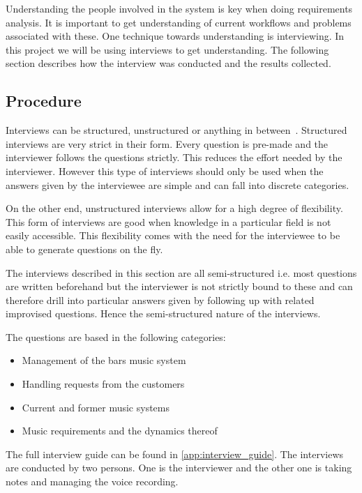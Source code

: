 \label{interviews}

Understanding the people involved in the system is key when doing requirements analysis. It is important to get understanding of current workflows and problems associated with these. One technique towards understanding is interviewing. In this project we will be using interviews to get understanding. The following section describes how the interview was conducted and the results collected.

\subsection{Procedure}
\label{sub:procedure}

Interviews can be structured, unstructured or anything in between~\cite{benyon2013designing}. Structured interviews are very strict in their form. Every question is pre-made and the interviewer follows the questions strictly. This reduces the effort needed by the interviewer. However this type of interviews should only be used when the answers given by the interviewee are simple and can fall into discrete categories.

On the other end, unstructured interviews allow for a high degree of flexibility. This form of interviews are good when knowledge in a particular field is not easily accessible. This flexibility comes with the need for the interviewee to be able to generate questions on the fly.

The interviews described in this section are all semi-structured i.e. most questions are written beforehand but the interviewer is not strictly bound to these and can therefore drill into particular answers given by following up with related improvised questions. Hence the semi-structured nature of the interviews.

The questions are based in the following categories:

\begin{itemize}
  \item Management of the bars music system
  \item Handling requests from the customers
  \item Current and former music systems
  \item Music requirements and the dynamics thereof
\end{itemize}

The full interview guide can be found in \cref{app:interview_guide}. The interviews are conducted by two persons. One is the interviewer and the other one is taking notes and managing the voice recording.


